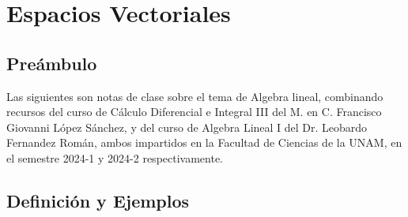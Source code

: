 \chapter{Espacios Vectoriales}

\section{Preámbulo}

Las siguientes son notas de clase sobre el tema de Algebra lineal, combinando recursos del curso de Cálculo Diferencial e Integral III del M. en C. Francisco Giovanni López Sánchez, y del curso de Algebra Lineal I del Dr. Leobardo Fernandez Román, ambos impartidos en la Facultad de Ciencias de la UNAM, en el semestre 2024-1 y 2024-2 respectivamente. 

\section{Definición y Ejemplos}

